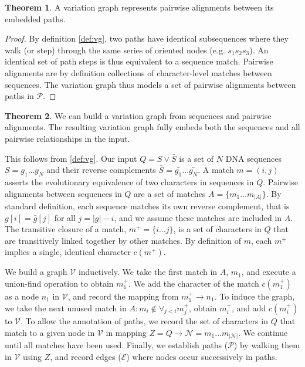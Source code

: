 \documentclass{bioinfo}
\theoremstyle{definition}
\newtheorem{theorem}{Theorem}[section]
\begin{document}
\begin{theorem}
A variation graph represents pairwise alignments between its embedded paths.
\end{theorem}

\begin{proof}
By definition \ref{def:vg}, two paths have identical subsequences where they walk (or step) through the same series of oriented nodes (e.g. $s_1 s_2 s_3$).
An identical set of path steps is thus equivalent to a sequence match.
Pairwise alignments are by definition collections of character-level matches between sequences.
The variation graph thus models a set of pairwise alignments between paths in $\mathcal{P}$.
\end{proof}

\begin{theorem}
\label{thm:seqwish}
We can build a variation graph from sequences and pairwise alignments.
The resulting variation graph fully embeds both the sequences and all pairwise relationships in the input.
\end{theorem}

This follows from \ref{def:vg}.
Our input $Q = S \vee \bar{S}$ is a set of $N$ DNA sequences $S = g_1 \ldots g_N$ and their reverse complements $\bar{S} = \bar{g_1} \ldots \bar{g_N}$.
A match $m = (i, j)$ asserts the evolutionary equivalence of two characters in sequences in $Q$.
Pairwise alignments between sequences in $Q$ are a set of matches $A = \{ m_1 \ldots m_{|A|} \}$.
By standard definition, each sequence matches its own reverse complement, that is $g[i] = \bar{g}[j]$ for all $j = |g| - i$, and we assume these matches are included in $A$.
The transitive closure of a match, $m^+ = \{ i \ldots j \}$, is a set of characters in $Q$ that are transitively linked together by other matches.
By definition of $m$, each $m^+$ implies a single, identical character $c(m^+)$.

We build a graph $\mathcal{V}$ inductively.
We take the first match in $A$, $m_1$, and execute a union-find operation to obtain $m_1^+$.
We add the character of the match $c(m_1^+)$ as a node $n_1$ in $\mathcal{V}$, and record the mapping from $m_1^+ \to n_1$.
To induce the graph, we take the next unused match in $A : m_i \notin \forall_{j < i} m_j^+$, obtain $m_i^+$, and add $c(m_i^+)$ to $\mathcal{V}$.
To allow the annotation of paths, we record the set of characters in $Q$ that match to a given node in $\mathcal{V}$ in mapping $Z = Q \to \mathcal{N} = m_1 \ldots m_{|\mathcal{N}|}$.
We continue until all matches have been used.
Finally, we establish paths ($\mathcal{P}$) by walking them in $\mathcal{V}$ using $Z$, and record edges ($\mathcal{E}$) where nodes occur successively in paths.
\end{document}
